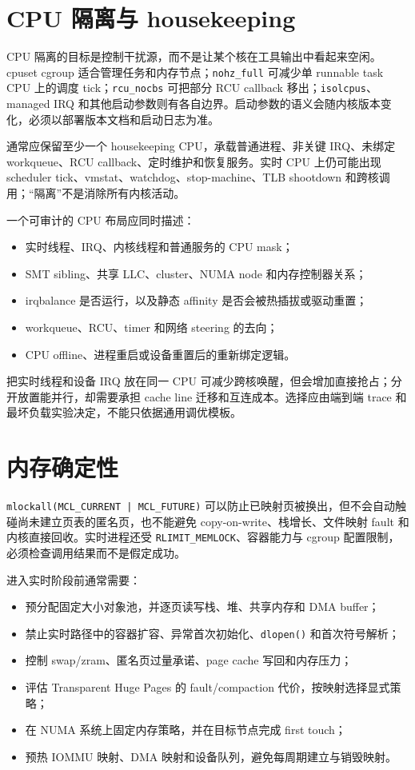 \section{CPU 隔离与 housekeeping}

CPU 隔离的目标是控制干扰源，而不是让某个核在工具输出中看起来空闲。cpuset cgroup 适合管理任务和内存节点；\texttt{nohz\_full} 可减少单 runnable task CPU 上的调度 tick；\texttt{rcu\_nocbs} 可把部分 RCU callback 移出；\texttt{isolcpus}、managed IRQ 和其他启动参数则有各自边界\cite{linux-nohz,linux-kernel-parameters}。启动参数的语义会随内核版本变化，必须以部署版本文档和启动日志为准。

通常应保留至少一个 housekeeping CPU，承载普通进程、非关键 IRQ、未绑定 workqueue、RCU callback、定时维护和恢复服务。实时 CPU 上仍可能出现 scheduler tick、vmstat、watchdog、stop-machine、TLB shootdown 和跨核调用；“隔离”不是消除所有内核活动。

一个可审计的 CPU 布局应同时描述：

\begin{itemize}
  \item 实时线程、IRQ、内核线程和普通服务的 CPU mask；
  \item SMT sibling、共享 LLC、cluster、NUMA node 和内存控制器关系；
  \item irqbalance 是否运行，以及静态 affinity 是否会被热插拔或驱动重置；
  \item workqueue、RCU、timer 和网络 steering 的去向；
  \item CPU offline、进程重启或设备重置后的重新绑定逻辑。
\end{itemize}

把实时线程和设备 IRQ 放在同一 CPU 可减少跨核唤醒，但会增加直接抢占；分开放置能并行，却需要承担 cache line 迁移和互连成本。选择应由端到端 trace 和最坏负载实验决定，不能只依据通用调优模板。

\section{内存确定性}

\texttt{mlockall(MCL\_CURRENT | MCL\_FUTURE)} 可以防止已映射页被换出，但不会自动触碰尚未建立页表的匿名页，也不能避免 copy-on-write、栈增长、文件映射 fault 和内核直接回收。实时进程还受 \texttt{RLIMIT\_MEMLOCK}、容器能力与 cgroup 配置限制，必须检查调用结果而不是假定成功。

进入实时阶段前通常需要：

\begin{itemize}
  \item 预分配固定大小对象池，并逐页读写栈、堆、共享内存和 DMA buffer；
  \item 禁止实时路径中的容器扩容、异常首次初始化、\texttt{dlopen()} 和首次符号解析；
  \item 控制 swap/zram、匿名页过量承诺、page cache 写回和内存压力；
  \item 评估 Transparent Huge Pages 的 fault/compaction 代价，按映射选择显式策略；
  \item 在 NUMA 系统上固定内存策略，并在目标节点完成 first touch；
  \item 预热 IOMMU 映射、DMA 映射和设备队列，避免每周期建立与销毁映射。
\end{itemize}

